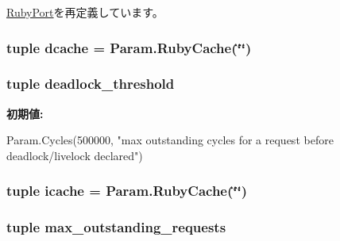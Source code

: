 \hyperlink{classSequencer_1_1RubyPort_a17da7064bc5c518791f0c891eff05fda}{RubyPort}を再定義しています。\hypertarget{classSequencer_1_1RubySequencer_a280088b2250121d87ebf513751fb240b}{
\subsubsection[{dcache}]{\setlength{\rightskip}{0pt plus 5cm}tuple {\bf dcache} = Param.RubyCache(\char`\"{}\char`\"{})}}
\label{classSequencer_1_1RubySequencer_a280088b2250121d87ebf513751fb240b}
\hypertarget{classSequencer_1_1RubySequencer_a642b24433a9b8d923a6fee4e6dce2bb0}{
\subsubsection[{deadlock\_\-threshold}]{\setlength{\rightskip}{0pt plus 5cm}tuple {\bf deadlock\_\-threshold}}}
\label{classSequencer_1_1RubySequencer_a642b24433a9b8d923a6fee4e6dce2bb0}
{\bfseries 初期値:}
\begin{DoxyCode}
Param.Cycles(500000,
        "max outstanding cycles for a request before deadlock/livelock declared")
      
\end{DoxyCode}
\hypertarget{classSequencer_1_1RubySequencer_a0324f1e40eeeac3fb68490e7a090f318}{
\subsubsection[{icache}]{\setlength{\rightskip}{0pt plus 5cm}tuple {\bf icache} = Param.RubyCache(\char`\"{}\char`\"{})}}
\label{classSequencer_1_1RubySequencer_a0324f1e40eeeac3fb68490e7a090f318}
\hypertarget{classSequencer_1_1RubySequencer_aea9a472530ae31f7705dc2511123df13}{
\subsubsection[{max\_\-outstanding\_\-requests}]{\setlength{\rightskip}{0pt plus 5cm}tuple {\bf max\_\-outstanding\_\-requests}}}
